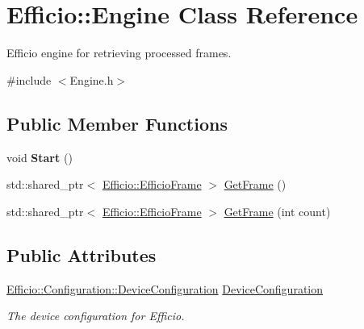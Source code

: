 \hypertarget{class_efficio_1_1_engine}{}\section{Efficio\+:\+:Engine Class Reference}
\label{class_efficio_1_1_engine}


Efficio engine for retrieving processed frames.  




{\ttfamily \#include $<$Engine.\+h$>$}

\subsection*{Public Member Functions}
\begin{DoxyCompactItemize}
\item 
\hypertarget{class_efficio_1_1_engine_a3b6e5c963c14df6e902f72df6a521fd1}{}\label{class_efficio_1_1_engine_a3b6e5c963c14df6e902f72df6a521fd1} 
void {\bfseries Start} ()
\item 
std\+::shared\+\_\+ptr$<$ \hyperlink{class_efficio_1_1_efficio_frame}{Efficio\+::\+Efficio\+Frame} $>$ \hyperlink{class_efficio_1_1_engine_a4f46a611516d157a32005a860128f9dc}{Get\+Frame} ()
\item 
std\+::shared\+\_\+ptr$<$ \hyperlink{class_efficio_1_1_efficio_frame}{Efficio\+::\+Efficio\+Frame} $>$ \hyperlink{class_efficio_1_1_engine_a9f81b122b1c2f768110675a79a842117}{Get\+Frame} (int count)
\end{DoxyCompactItemize}
\subsection*{Public Attributes}
\begin{DoxyCompactItemize}
\item 
\hypertarget{class_efficio_1_1_engine_afbaba10c9c508bdcc16625a2e51a6148}{}\label{class_efficio_1_1_engine_afbaba10c9c508bdcc16625a2e51a6148} 
\hyperlink{class_efficio_1_1_configuration_1_1_device_configuration}{Efficio\+::\+Configuration\+::\+Device\+Configuration} \hyperlink{class_efficio_1_1_engine_afbaba10c9c508bdcc16625a2e51a6148}{Device\+Configuration}
\begin{DoxyCompactList}\small\item\em The device configuration for Efficio. \end{DoxyCompactList}\end{DoxyCompactItemize}


